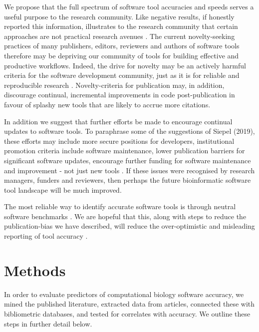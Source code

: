 \documentclass{bmcart}
\begin{document}
We propose that the full spectrum of software tool accuracies and
speeds serves a useful purpose to the research community. Like
negative results, if honestly reported this information, illustrates
to the research community that certain approaches are not practical
research avenues
\cite{fanelli2012negative}. %
The current novelty-seeking practices of many publishers, editors,
reviewers and authors of software tools therefore may be depriving our
community of tools for building effective and productive workflows.
{\color{black} Indeed, the drive for novelty may be an actively harmful
  criteria for the software development community, just as it is for reliable
  and reproducible research
  \cite{brembs2019reliable}. Novelty-criteria for publication may, in
  addition, discourage continual, incremental improvements in code
  post-publication in favour of splashy new tools that are likely to
  accrue more citations. }

{\color{black} In addition we suggest that further efforts be made to
  encourage continual updates to software tools. To paraphrase some of
  the suggestions of Siepel (2019), these efforts may include more
  secure positions for developers, institutional promotion criteria
  include software maintenance, lower publication barriers for
  significant software updates, encourage further funding for software
  maintenance and improvement - not just new tools
  \cite{siepel2019challenges}. If these issues were recognised by
  research managers, funders and reviewers, then perhaps
  the future bioinformatic software tool landscape will be much improved. }


The most reliable way to identify accurate software tools is through neutral
software benchmarks \cite{Boulesteix2013-vb}. We are hopeful that
this, along with steps to reduce the publication-bias we have
described, will reduce the over-optimistic and misleading reporting of
tool accuracy \cite{Boulesteix2010-te,Jelizarow2010-zf,Norel2011-cq}.


\section*{Methods}
In order to evaluate predictors of computational biology software
accuracy, we mined the published literature, extracted data from
articles, connected these with bibliometric databases, and tested for
correlates with accuracy. We outline these steps in further detail
below.
\end{document}
